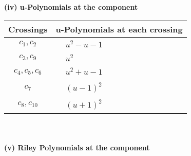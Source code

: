 \documentclass[1p]{elsarticle_modified}
\theoremstyle{definition}
\begin{document}
\newpage\renewcommand{\arraystretch}{1}
\flushleft \textbf{(iv) u-Polynomials at the component}\newline \\
\begin{tabular}{m{50pt}|m{274pt}}
Crossings & \hspace{64pt}u-Polynomials at each crossing \\
\hline $$\begin{aligned}c_{1},c_{2}\end{aligned}$$&$\begin{aligned}
&u^2- u-1
\end{aligned}$\\
\hline $$\begin{aligned}c_{3},c_{9}\end{aligned}$$&$\begin{aligned}
&u^2
\end{aligned}$\\
\hline $$\begin{aligned}c_{4},c_{5},c_{6}\end{aligned}$$&$\begin{aligned}
&u^2+u-1
\end{aligned}$\\
\hline $$\begin{aligned}c_{7}\end{aligned}$$&$\begin{aligned}
&(u-1)^2
\end{aligned}$\\
\hline $$\begin{aligned}c_{8},c_{10}\end{aligned}$$&$\begin{aligned}
&(u+1)^2
\end{aligned}$\\
\hline
\end{tabular}\\~\\
\newpage\renewcommand{\arraystretch}{1}
\flushleft \textbf{(v) Riley Polynomials at the component}\newline \\
\end{document}
